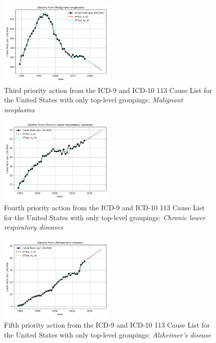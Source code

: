\documentclass[10pt, a4paper, twocolumn]{IEEEconf}
\begin{document}
\begin{figure}[H]
  \centering
  \includegraphics[width=0.5\textwidth]{results/US_ICD_113_SELECTED_CAUSES_ROOTS/Malignant_neoplasms_ets.png}
  \caption{Third priority action from the ICD-9 and ICD-10 113 Cause List for the United States with only top-level groupings: \textit{Malignant neoplasms}}\label{fig:k4c}
\end{figure}

\begin{figure}[H]
  \centering
  \includegraphics[width=0.5\textwidth]{results/US_ICD_113_SELECTED_CAUSES_ROOTS/Chronic_lower_respiratory_diseases_ets.png}
  \caption{Fourth priority action from the ICD-9 and ICD-10 113 Cause List for the United States with only top-level groupings: \textit{Chronic lower respiratory diseases}}\label{fig:k4d}
\end{figure}

\begin{figure}[H]
  \centering
  \includegraphics[width=0.5\textwidth]{results/US_ICD_113_SELECTED_CAUSES_ROOTS/Alzheimer_s_disease_ets.png}
  \caption{Fifth priority action from the ICD-9 and ICD-10 113 Cause List for the United States with only top-level groupings: \textit{Alzheimer's disease}}\label{fig:k4e}
\end{figure}
\end{document}
